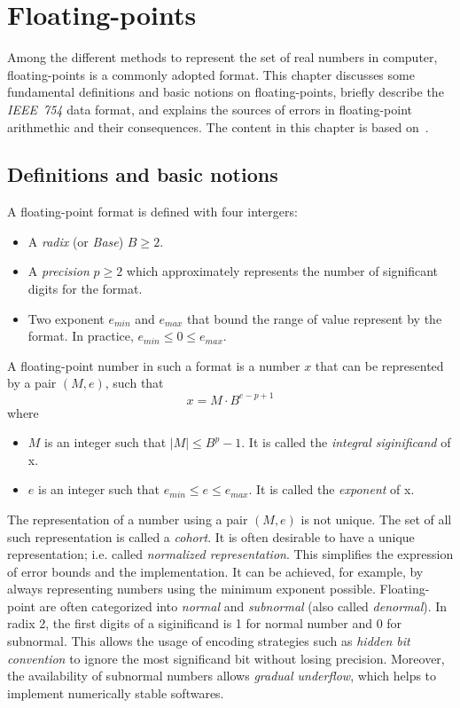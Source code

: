 \chapter{Floating-points}
\label{ch:background}
Among the different methods to represent the set of real numbers in computer,
floating-points is a commonly adopted format.
This chapter discusses some fundamental definitions and basic notions on
floating-points, briefly describe the \textit{IEEE~754} data format, and 
explains the sources of errors in floating-point arithmethic and their consequences.
The content in this chapter is based on~\cite{Muller2018-zm}.

\section{Definitions and basic notions}
A floating-point format is defined with four intergers:
\begin{itemize}
	\item A \textit{radix} (or \textit{Base}) $B \ge 2$.
	\item A \textit{precision} $p \ge 2$ which approximately represents the number of significant digits for the format.
	\item Two exponent $e_{min}$ and $e_{max}$ that bound the range of value represent by the format. In practice, $e_{min} \le 0 \le e_{max}$.
\end{itemize}

A floating-point number in such a format is a number $x$ that can be represented by a pair $(M,e)$, such that
\begin{equation}
	x = M \cdot B^{e-p+1}
\end{equation}
where
\begin{itemize}
	\item $M$ is an integer such that $|M| \le B^{p}-1$. It is called the \textit{integral siginificand} of x.
	\item $e$ is an integer such that $e_{min} \le e \le e_{max}$. It is called the \textit{exponent} of x.
\end{itemize}
The representation of a number using a pair $(M, e)$ is not unique.
The set of all such representation is called a \textit{cohort}.
It is often desirable to have a unique representation; i.e. called \textit{normalized representation}.
This simplifies the expression of error bounds and the implementation.
It can be achieved, for example, by always representing numbers using the minimum exponent possible.
Floating-point are often categorized into \textit{normal} and \textit{subnormal} (also called \textit{denormal}).
In radix 2, the first digits of a siginificand is 1 for normal number and 0 for subnormal.
This allows the usage of encoding strategies such as \textit{hidden bit convention} to
ignore the most significand bit without losing precision.
Moreover, the availability of subnormal numbers allows \textit{gradual underflow},
which helps to implement numerically stable softwares.

